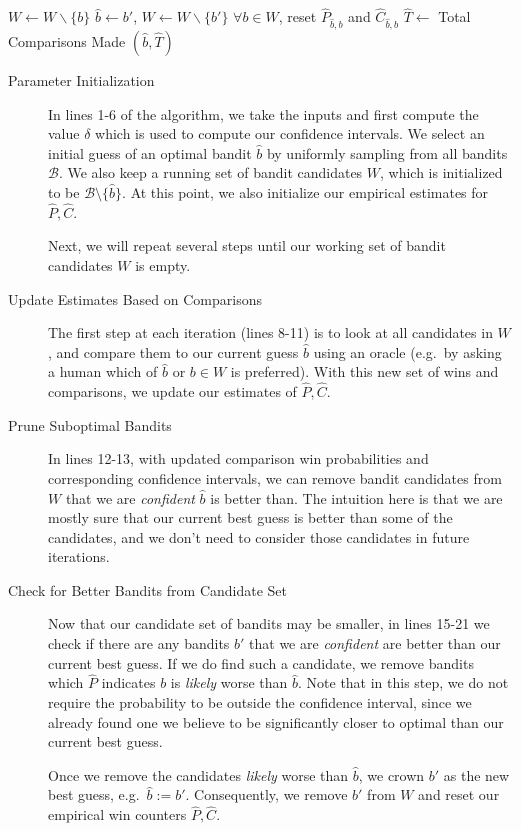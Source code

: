\documentclass[
  letterpaper,
  numbers=noenddot,
  DIV=11]{scrreprt}
\theoremstyle{plain}
\theoremstyle{definition}
\theoremstyle{remark}
\begin{document}
\(W \gets W \backslash \{b\}\) \(\hat{b} \gets b'\),
\(W \gets W \backslash \{b'\}\) \(\forall b \in W\), reset
\(\hat{P}_{\hat{b},b}\) and \(\hat{C}_{\hat{b},b}\) \(\hat{T} \gets\)
Total Comparisons Made \((\hat{b}, \hat{T})\)

\begin{description}
\item[Parameter Initialization]
In lines 1-6 of the algorithm, we take the inputs and first compute the
value \(\delta\) which is used to compute our confidence intervals. We
select an initial guess of an optimal bandit \(\hat{b}\) by uniformly
sampling from all bandits \(\mathcal{B}\). We also keep a running set of
bandit candidates \(W\), which is initialized to be
\(\mathcal{B} \setminus \{\hat{b}\}\). At this point, we also initialize
our empirical estimates for \(\hat{P}, \hat{C}\).

Next, we will repeat several steps until our working set of bandit
candidates \(W\) is empty.
\item[Update Estimates Based on Comparisons]
The first step at each iteration (lines 8-11) is to look at all
candidates in \(W\), and compare them to our current guess \(\hat{b}\)
using an oracle (e.g.~by asking a human which of \(\hat{b}\) or
\(b \in W\) is preferred). With this new set of wins and comparisons, we
update our estimates of \(\hat{P}, \hat{C}\).
\item[Prune Suboptimal Bandits]
In lines 12-13, with updated comparison win probabilities and
corresponding confidence intervals, we can remove bandit candidates from
\(W\) that we are \emph{confident} \(\hat{b}\) is better than. The
intuition here is that we are mostly sure that our current best guess is
better than some of the candidates, and we don't need to consider those
candidates in future iterations.
\item[Check for Better Bandits from Candidate Set]
Now that our candidate set of bandits may be smaller, in lines 15-21 we
check if there are any bandits \(b'\) that we are \emph{confident} are
better than our current best guess. If we do find such a candidate, we
remove bandits which \(\hat{P}\) indicates \(b\) is \emph{likely} worse
than \(\hat{b}\). Note that in this step, we do not require the
probability to be outside the confidence interval, since we already
found one we believe to be significantly closer to optimal than our
current best guess.

Once we remove the candidates \emph{likely} worse than \(\hat{b}\), we
crown \(b'\) as the new best guess, e.g.~\(\hat{b} := b'\).
Consequently, we remove \(b'\) from \(W\) and reset our empirical win
counters \(\hat{P}, \hat{C}\).
\end{description}
\end{document}
